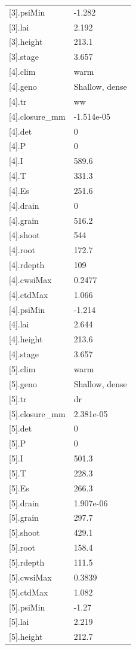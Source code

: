 {\begin{longtable}{p{}p{}}
{}[3].psiMin & -1.282\\
{}[3].lai & 2.192\\
{}[3].height & 213.1\\
{}[3].stage & 3.657\\
{}[4].clim & warm\\
{}[4].geno & Shallow, dense\\
{}[4].tr & ww\\
{}[4].closure\_mm & -1.514e-05\\
{}[4].det & 0\\
{}[4].P & 0\\
{}[4].I & 589.6\\
{}[4].T & 331.3\\
{}[4].Es & 251.6\\
{}[4].drain & 0\\
{}[4].grain & 516.2\\
{}[4].shoot & 544\\
{}[4].root & 172.7\\
{}[4].rdepth & 109\\
{}[4].cwsiMax & 0.2477\\
{}[4].ctdMax & 1.066\\
{}[4].psiMin & -1.214\\
{}[4].lai & 2.644\\
{}[4].height & 213.6\\
{}[4].stage & 3.657\\
{}[5].clim & warm\\
{}[5].geno & Shallow, dense\\
{}[5].tr & dr\\
{}[5].closure\_mm & 2.381e-05\\
{}[5].det & 0\\
{}[5].P & 0\\
{}[5].I & 501.3\\
{}[5].T & 228.3\\
{}[5].Es & 266.3\\
{}[5].drain & 1.907e-06\\
{}[5].grain & 297.7\\
{}[5].shoot & 429.1\\
{}[5].root & 158.4\\
{}[5].rdepth & 111.5\\
{}[5].cwsiMax & 0.3839\\
{}[5].ctdMax & 1.082\\
{}[5].psiMin & -1.27\\
{}[5].lai & 2.219\\
{}[5].height & 212.7\\

\end{longtable}}
